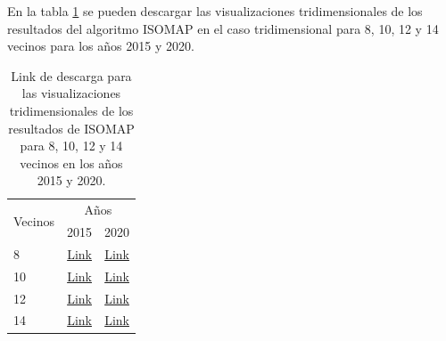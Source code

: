 En la tabla \ref{table:isomap_results} se pueden descargar las visualizaciones tridimensionales de los resultados del algoritmo ISOMAP en el caso tridimensional para 8, 10, 12 y 14 vecinos para los años 2015 y 2020.

\begin{table}[H]
    \centering
    \begin{tabular}{lrr} \hline
        \multirow{2}{*}{Vecinos} & \multicolumn{2}{c}{Años}                                                                                                                                                                                                                                                \\ \cline{2-3}
                                 & 2015                                                                                                                               & 2020                                                                                                                               \\ \hline
        8                        & \href{https://github.com/giovannilopez9808/Reconocimiento_de_patrones_proyecto/raw/main/Graphics/Data_2015/ISOMAP_3D_8.mp4}{Link}  & \href{https://github.com/giovannilopez9808/Reconocimiento_de_patrones_proyecto/raw/main/Graphics/Data_2020/ISOMAP_3D_8.mp4}{Link}  \\
        10                       & \href{https://github.com/giovannilopez9808/Reconocimiento_de_patrones_proyecto/raw/main/Graphics/Data_2015/ISOMAP_3D_10.mp4}{Link} & \href{https://github.com/giovannilopez9808/Reconocimiento_de_patrones_proyecto/raw/main/Graphics/Data_2020/ISOMAP_3D_10.mp4}{Link} \\
        12                       & \href{https://github.com/giovannilopez9808/Reconocimiento_de_patrones_proyecto/raw/main/Graphics/Data_2015/ISOMAP_3D_12.mp4}{Link} & \href{https://github.com/giovannilopez9808/Reconocimiento_de_patrones_proyecto/raw/main/Graphics/Data_2020/ISOMAP_3D_12.mp4}{Link} \\
        14                       & \href{https://github.com/giovannilopez9808/Reconocimiento_de_patrones_proyecto/raw/main/Graphics/Data_2015/ISOMAP_3D_14.mp4}{Link} & \href{https://github.com/giovannilopez9808/Reconocimiento_de_patrones_proyecto/raw/main/Graphics/Data_2020/ISOMAP_3D_14.mp4}{Link} \\ \hline
    \end{tabular}
    \caption{Link de descarga para las visualizaciones tridimensionales de los resultados de ISOMAP para 8, 10, 12 y 14 vecinos en los años 2015 y 2020.}
    \label{table:isomap_results}
\end{table}